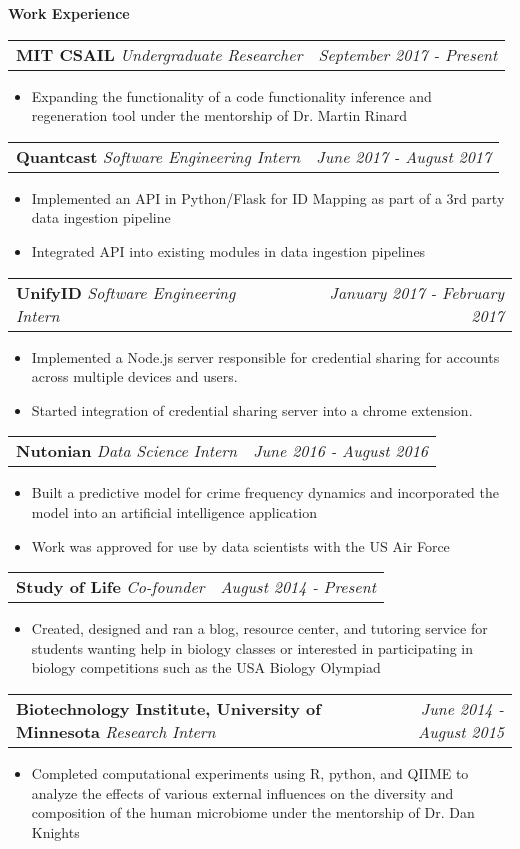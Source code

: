 \documentclass[letterpaper,10pt]{article}
\makeatletter
\newcommand{\resitem}[1]{\item #1 \vspace{-2pt}}
\newcommand{\resheading}[1]{{\large \colorbox{mygrey}{\begin{minipage}{\textwidth}{\textbf{#1 \vphantom{p\^{E}}}}\end{minipage}}}}
\newcommand{\ressubheading}[3]{
\begin{tabular*}{7.4in}{l@{\extracolsep{\fill}}r}
        \textbf{#1} \textit{#2} & \textit{#3} \\
\end{tabular*}\vspace{-6pt}}
\makeatother
\begin{document}
\resheading{Work Experience}
\begin{description}
\item
  \ressubheading{MIT CSAIL}{Undergraduate Researcher}{September 2017 - Present}
  \begin{itemize}[leftmargin=-1mm]
    \resitem{Expanding the functionality of a code functionality inference and regeneration tool under the mentorship of Dr. Martin Rinard}
  \end{itemize}


\item
  \ressubheading{Quantcast}{Software Engineering Intern}{June 2017 - August 2017}
  \begin{itemize}[leftmargin=-1mm]
    \resitem{Implemented an API in Python/Flask for ID Mapping as part of a 3rd party data ingestion pipeline}
    \resitem{Integrated API into existing modules in data ingestion pipelines}
  \end{itemize}

\item
  \ressubheading{UnifyID}{Software Engineering Intern}{January 2017 - February 2017}
  \begin{itemize}[leftmargin=-1mm]
    \resitem{Implemented a Node.js server responsible for credential sharing for accounts across multiple devices and users.}
    \resitem{Started integration of credential sharing server into a chrome extension.}
  \end{itemize}
\item
  \ressubheading{Nutonian}{Data Science Intern}{June 2016 - August 2016}
  \begin{itemize}[leftmargin=-1mm]
    \resitem{Built a predictive model for crime frequency dynamics and incorporated the model into an artificial intelligence application}
    \resitem{Work was approved for use by data scientists with the US Air Force}
  \end{itemize}



\item
  \ressubheading{Study of Life}{Co-founder}{August 2014 - Present}
  \begin{itemize}[leftmargin=-1mm]
    \resitem{Created, designed and ran a blog, resource center, and tutoring service for students wanting help in biology classes or interested in participating in biology competitions such as the USA Biology Olympiad}

  \end{itemize}
  
\item
  \ressubheading{Biotechnology Institute, University of Minnesota}{Research Intern}{June 2014 - August 2015}
  \begin{itemize}[leftmargin=-1mm]
    \resitem{Completed computational experiments using R, python, and QIIME to analyze the effects of various external influences on the diversity and composition of the human microbiome under the mentorship of Dr. Dan Knights}

  \end{itemize}

\end{description}
\end{document}
